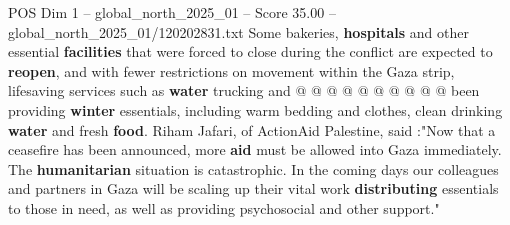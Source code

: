 \begin{textsample}{POS Dim 1 – global\_north\_2025\_01 – Score 35.00 – global\_north\_2025\_01/120202831.txt}
Some bakeries, \textbf{hospitals} and other essential \textbf{facilities} that were forced to close during the conflict are expected to \textbf{reopen}, and with fewer restrictions on movement within the Gaza strip, lifesaving services such as \textbf{water} trucking and @ @ @ @ @ @ @ @ @ @ been providing \textbf{winter} essentials, including warm bedding and clothes, clean drinking \textbf{water} and fresh \textbf{food}.
Riham Jafari, of ActionAid Palestine, said :"Now that a ceasefire has been announced, more \textbf{aid} must be allowed into Gaza immediately.
The \textbf{humanitarian} situation is catastrophic.
In the coming days our colleagues and partners in Gaza will be scaling up their vital work \textbf{distributing} essentials to those in need, as well as providing psychosocial and other support."

\end{textsample}
